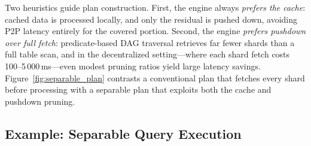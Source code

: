 Two heuristics guide plan construction.  First, the engine always
\emph{prefers the cache}: cached data is processed locally, and only
the residual is pushed down, avoiding P2P latency entirely for the
covered portion.  Second, the engine \emph{prefers pushdown over full
fetch}: predicate-based DAG traversal retrieves far fewer shards than
a full table scan, and in the decentralized setting---where each
shard fetch costs 100--5\,000\,ms---even modest pruning ratios yield
large latency savings.  Figure~\ref{fig:separable_plan} contrasts a
conventional plan that fetches every shard before processing with a
separable plan that exploits both the cache and pushdown pruning.


\subsection{Example: Separable Query Execution}
\label{sec:example_join}

